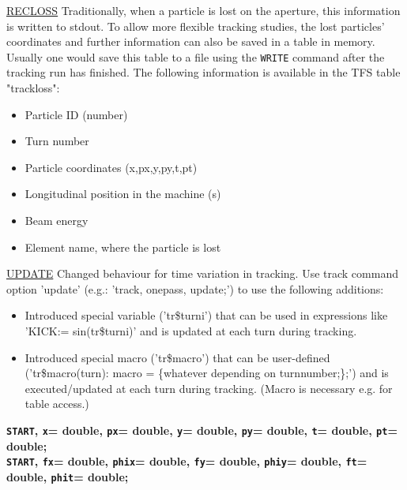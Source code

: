 \begin{description}
\href{track:remarks:recloss:notes}{RECLOSS}
             Traditionally, when a particle is lost on the aperture, this information is written to stdout. To allow more flexible 
             tracking studies, the lost particles' coordinates and further information can also be saved in a table in memory. 
             Usually one would save this table to a file using the \texttt{WRITE} command after the tracking run has finished.
             The following information is available in the TFS table "trackloss":
             
\begin{itemize}
	\item Particle ID (number)
	\item Turn number
	\item Particle coordinates (x,px,y,py,t,pt)
	\item Longitudinal position in the machine (s)
	\item Beam energy
	\item Element name, where the particle is lost
\end{itemize}

\href{track:remarks:update:notes}{UPDATE}
             Changed behaviour for time variation in tracking. Use
             track command option 'update' (e.g.: 'track, onepass,
             update;') to use the following additions: 
             
\begin{itemize}
	\item  Introduced special variable ('tr\$turni') that can be
                  used in expressions like 'KICK:= sin(tr\$turni)' and is updated at each turn during tracking.
               
	\item  Introduced special macro ('tr\$macro') that can be
                     user-defined ('tr\$macro(turn): macro = \{whatever
                        depending on turnnumber;\};') and is executed/updated at each turn during tracking.
                        (Macro is necessary e.g. for table access.)
               
\end{itemize}

	\item{\textbf{\texttt{START}, \texttt{x}= double, \texttt{px}= double, \texttt{y}= double, \texttt{py}= double, \texttt{t}= double, \texttt{pt}= double;}
\\\textbf{\texttt{START}, \texttt{fx}= double, \texttt{phix}= double, \texttt{fy}= double, \texttt{phiy}= double, \texttt{ft}= double, \texttt{phit}= double;}} 


\end{description}
